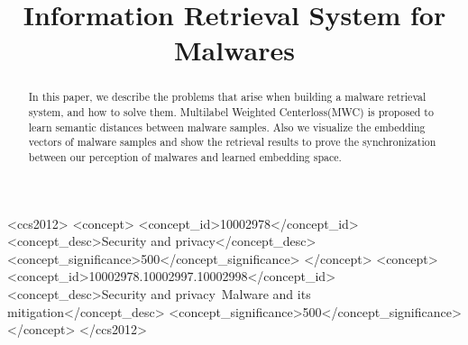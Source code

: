 \documentclass[sigconf, anonymous]{acmart}
\begin{document}
\title{Information Retrieval System for Malwares} %

\begin{abstract}
In this paper, we describe the problems that arise when building a malware retrieval system, and how to solve them. Multilabel Weighted Centerloss(MWC) is proposed to learn semantic distances between malware samples. Also we visualize the embedding vectors of malware samples and show the retrieval results to prove the synchronization between our perception of malwares and learned embedding space. \cite{medvinsky1993netcash}
\end{abstract}

\begin{CCSXML}
<ccs2012>
<concept>
<concept_id>10002978</concept_id>
<concept_desc>Security and privacy</concept_desc>
<concept_significance>500</concept_significance>
</concept>
<concept>
<concept_id>10002978.10002997.10002998</concept_id>
<concept_desc>Security and privacy~Malware and its mitigation</concept_desc>
<concept_significance>500</concept_significance>
</concept>
</ccs2012>
\end{CCSXML}



\maketitle




\end{document}
